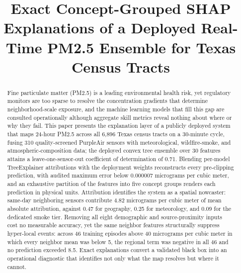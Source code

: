 \documentclass[conference]{IEEEtran}
\begin{document}
\title{Exact Concept-Grouped SHAP Explanations of a Deployed Real-Time
PM2.5 Ensemble for Texas Census Tracts}

\author{
\and
{}
\and
{}
}

\maketitle

\begin{abstract}
Fine particulate matter (PM2.5) is a leading environmental health risk,
yet regulatory monitors are too sparse to resolve the concentration
gradients that determine neighborhood-scale exposure, and the machine
learning models that fill this gap are consulted operationally although
aggregate skill metrics reveal nothing about where or why they fail. This
paper presents the explanation layer of a publicly deployed system that
maps 24-hour PM2.5 across all 6,896 Texas census tracts on a 30-minute
cycle, fusing 310 quality-screened PurpleAir sensors with
meteorological, wildfire-smoke, and atmospheric-composition data; the
deployed convex tree ensemble over 30 features attains a
leave-one-sensor-out coefficient of determination of 0.71. Blending
per-model TreeExplainer attributions with the deployment weights
reconstructs every pre-clipping prediction, with audited maximum error
below 0.000007 micrograms per cubic meter, and an exhaustive partition of
the features into five concept groups renders each prediction in
physical units. Attribution identifies the system as a
spatial nowcaster: same-day neighboring sensors contribute 4.82
micrograms per cubic meter of mean absolute attribution, against 0.47 for
geography, 0.25 for meteorology, and 0.09 for the dedicated smoke tier.
Removing all eight demographic and source-proximity inputs cost no
measurable accuracy, yet the same neighbor features structurally
suppress hyper-local events: across 46
training episodes above 40 micrograms per cubic meter in which every
neighbor mean was below 5, the regional term was negative in all 46 and
no prediction exceeded 8.5. Exact explanations convert a validated black
box into an operational diagnostic that identifies not only what the map
resolves but where it cannot.
\end{abstract}
\end{document}
